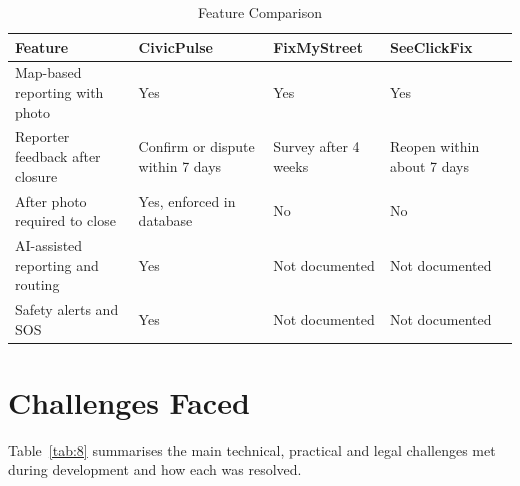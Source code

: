 \documentclass[conference]{IEEEtran}
\begin{document}
\begin{table}[htbp]
\caption{Feature Comparison}
\label{tab:7}
\begin{center}
\footnotesize
\begin{tabular}{|>{\raggedright\arraybackslash}p{}|>{\raggedright\arraybackslash}p{}|>{\raggedright\arraybackslash}p{}|>{\raggedright\arraybackslash}p{}|}
\hline
\textbf{Feature} & \textbf{CivicPulse} & \textbf{FixMyStreet} & \textbf{SeeClickFix} \\
\hline
Map-based reporting with photo & Yes & Yes & Yes \\ \hline
Reporter feedback after closure & Confirm or dispute within 7 days & Survey after 4 weeks & Reopen within about 7 days \\ \hline
After photo required to close & Yes, enforced in database & No & No \\ \hline
AI-assisted reporting and routing & Yes & Not documented & Not documented \\ \hline
Safety alerts and SOS & Yes & Not documented & Not documented \\ \hline
\end{tabular}
\end{center}
\end{table}
\section{Challenges Faced}
Table~\ref{tab:8} summarises the main technical, practical and legal challenges met during development and how each was resolved.
\end{document}
